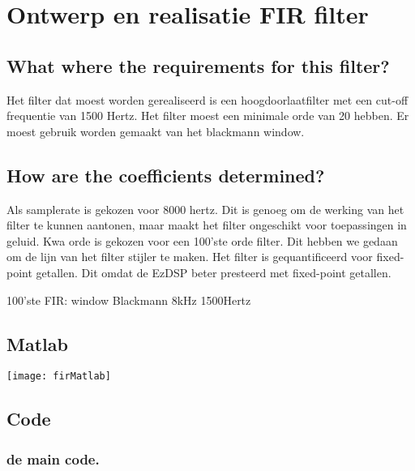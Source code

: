 \section{Ontwerp en realisatie FIR filter}

\subsection{What where the requirements for this filter?}
Het filter dat moest worden gerealiseerd is een hoogdoorlaatfilter met een cut-off frequentie van 1500 Hertz. 
Het filter moest een minimale orde van 20 hebben. Er moest gebruik worden gemaakt van het blackmann window.

\subsection{How are the coefficients determined?}
Als samplerate is gekozen voor 8000 hertz. Dit is genoeg om de werking van het filter te kunnen aantonen, maar maakt het filter ongeschikt voor toepassingen in geluid. 
Kwa orde is gekozen voor een 100'ste orde filter. Dit hebben we gedaan om de lijn van het filter stijler te maken.
Het filter is gequantificeerd voor fixed-point getallen. Dit omdat de EzDSP beter presteerd met fixed-point getallen.


    \begin{enumerate}[label=\emph{\alph*)}]
         100'ste
         FIR: window
         Blackmann
         8kHz
         1500Hertz
    \end{enumerate}

    \subsection{Matlab}
    
    \texttt{[image: firMatlab]}\par\vspace{1cm}
    \clearpage
    \subsection{Code}

    \subsubsection{de main code.}
        
